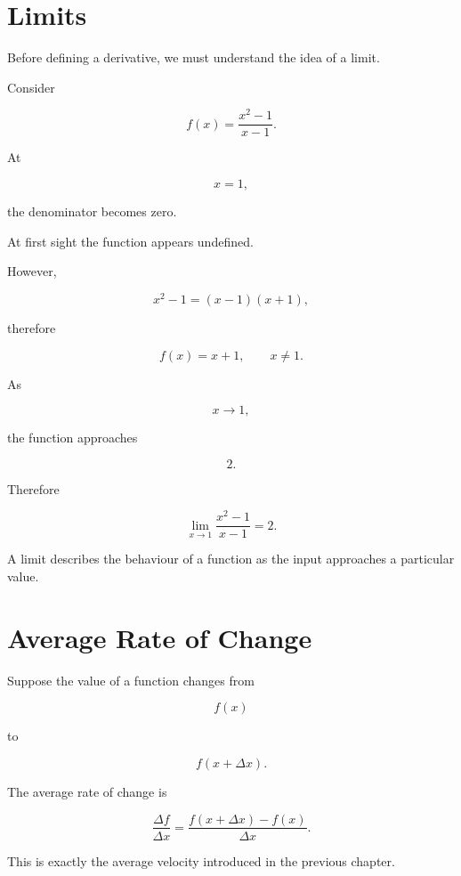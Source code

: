 \documentclass[11pt,a4paper,openany]{book}
\begin{document}

\section{Limits}

Before defining a derivative, we must understand the idea of a limit.

Consider

\[
f(x)=\frac{x^2-1}{x-1}.
\]

At

\[
x=1,
\]

the denominator becomes zero.

At first sight the function appears undefined.

However,

\[
x^2-1=(x-1)(x+1),
\]

therefore

\[
f(x)=x+1,
\qquad x\neq1.
\]

As

\[
x\rightarrow1,
\]

the function approaches

\[
2.
\]

Therefore

\[
\boxed{
	\lim_{x\rightarrow1}
	\frac{x^2-1}{x-1}
	=2.
}
\]

A limit describes the behaviour of a function as the input approaches
a particular value.


\section{Average Rate of Change}

Suppose the value of a function changes from

\[
f(x)
\]

to

\[
f(x+\Delta x).
\]

The average rate of change is

\[
\boxed{
	\frac{\Delta f}{\Delta x}
	=
	\frac{f(x+\Delta x)-f(x)}
	{\Delta x}.
}
\]

This is exactly the average velocity introduced in the previous chapter.

\end{document}
